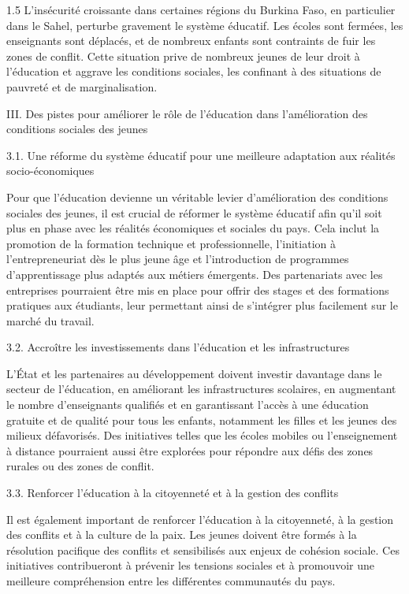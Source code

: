 \documentclass[12pt]{article}
\begin{document}
\begin{spacing}{1.5}
L'insécurité croissante dans certaines régions du Burkina Faso, en particulier dans le Sahel, perturbe gravement le système éducatif. Les écoles sont fermées, les enseignants sont déplacés, et de nombreux enfants sont contraints de fuir les zones de conflit. Cette situation prive de nombreux jeunes de leur droit à l'éducation et aggrave les conditions sociales, les confinant à des situations de pauvreté et de marginalisation.

III. Des pistes pour améliorer le rôle de l'éducation dans l'amélioration des conditions sociales des jeunes

3.1. Une réforme du système éducatif pour une meilleure adaptation aux réalités socio-économiques
 
Pour que l'éducation devienne un véritable levier d'amélioration des conditions sociales des jeunes, il est crucial de réformer le système éducatif afin qu'il soit plus en phase avec les réalités économiques et sociales du pays. Cela inclut la promotion de la formation technique et professionnelle, l'initiation à l'entrepreneuriat dès le plus jeune âge et l'introduction de programmes d'apprentissage plus adaptés aux métiers émergents. Des partenariats avec les entreprises pourraient être mis en place pour offrir des stages et des formations pratiques aux étudiants, leur permettant ainsi de s'intégrer plus facilement sur le marché du travail.

3.2. Accroître les investissements dans l'éducation et les infrastructures 

L'État et les partenaires au développement doivent investir davantage dans le secteur de l'éducation, en améliorant les infrastructures scolaires, en augmentant le nombre d'enseignants qualifiés et en garantissant l'accès à une éducation gratuite et de qualité pour tous les enfants, notamment les filles et les jeunes des milieux défavorisés. Des initiatives telles que les écoles mobiles ou l'enseignement à distance pourraient aussi être explorées pour répondre aux défis des zones rurales ou des zones de conflit.

3.3. Renforcer l'éducation à la citoyenneté et à la gestion des conflits
  
Il est également important de renforcer l'éducation à la citoyenneté, à la gestion des conflits et à la culture de la paix. Les jeunes doivent être formés à la résolution pacifique des conflits et sensibilisés aux enjeux de cohésion sociale. Ces initiatives contribueront à prévenir les tensions sociales et à promouvoir une meilleure compréhension entre les différentes communautés du pays.



\end{spacing}
\end{document}
